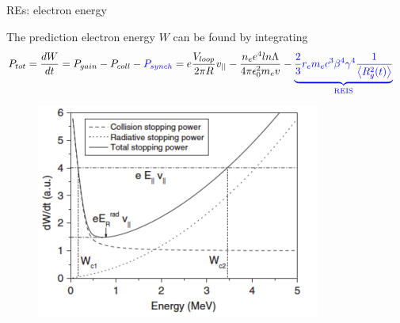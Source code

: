 \documentclass{beamer}
\begin{document}
\begin{frame}{REs: electron energy}
\scriptsize

The prediction electron energy $W$ can be found \cite{Martin-Solis2010} by integrating
\begin{align*}
P_{tot} &= \frac{d W}{dt} = P_{gain} - P_{coll} - \color{blue}{P_{synch}} \color{black}{}= e \frac{V_{loop}}{2 \pi R} v_{||} - \frac{n_e e^4 ln \Lambda}{4 \pi \epsilon^2_0 m_e v}- \color{blue}{\underbrace{\frac{2}{3} r_e m_e c^3 \beta^4 \gamma ^4 \frac{1}{\left< R^2_{g}(t)\right>}}_\text{REIS}} \nonumber   \nonumber 
\end{align*}

    \begin{figure}
	    \vspace*{-0.6cm}
	    \includegraphics[width=0.6\linewidth]{drive/total_power_emitted.png}
	\end{figure}
	
\end{frame}
\end{document}
